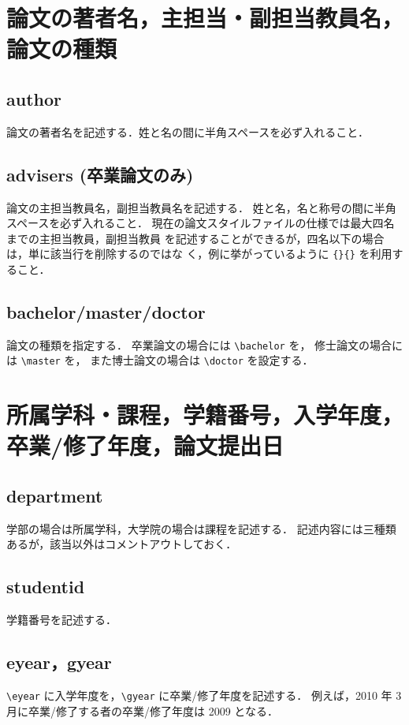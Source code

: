 \documentclass[11pt,titlepage,uplatex]{ujreport}
\begin{document}
\section{論文の著者名，主担当・副担当教員名，論文の種類}
\subsection{author}
論文の著者名を記述する．姓と名の間に半角スペースを必ず入れること．

\subsection{advisers (卒業論文のみ)}
論文の主担当教員名，副担当教員名を記述する．
姓と名，名と称号の間に半角スペースを必ず入れること．
現在の論文スタイルファイルの仕様では最大四名までの主担当教員，副担当教員
を記述することができるが，四名以下の場合は，単に該当行を削除するのではな
く，例に挙がっているように \verb|{}{}| を利用すること．

\subsection{bachelor/master/doctor}
論文の種類を指定する．
卒業論文の場合には \verb|\bachelor| を，
修士論文の場合には \verb|\master| を，
また博士論文の場合は \verb|\doctor| を設定する．

\section{所属学科・課程，学籍番号，入学年度，卒業/修了年度，論文提出日}

\subsection{department}
学部の場合は所属学科，大学院の場合は課程を記述する．
記述内容には三種類あるが，該当以外はコメントアウトしておく．

\subsection{studentid}
学籍番号を記述する．

\subsection{eyear，gyear}
\verb|\eyear| に入学年度を，\verb|\gyear| に卒業/修了年度を記述する．
例えば，2010 年 3 月に卒業/修了する者の卒業/修了年度は 2009 となる．
\end{document}
